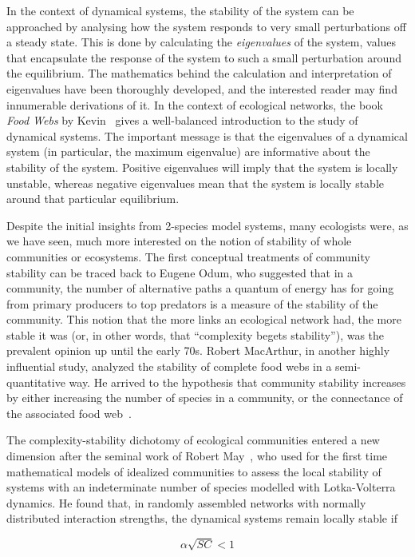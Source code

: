 In the context of dynamical systems, the stability of the system can be approached by analysing how the system responds to very small perturbations off a steady state. This is done by calculating the \textit{eigenvalues} of the system, values that encapsulate the response of the system to such a small perturbation around the equilibrium. The mathematics behind the calculation and interpretation of eigenvalues have been thoroughly developed, and the interested reader may find innumerable derivations of it. In the context of ecological networks, the book \textit{Food Webs} by Kevin~\cite{McCann2011} gives a well-balanced introduction to the study of dynamical systems. The important message is that the eigenvalues of a dynamical system (in particular, the maximum eigenvalue) are informative about the stability of the system. Positive eigenvalues will imply that the system is locally unstable, whereas negative eigenvalues mean that the system is locally stable around that particular equilibrium.

Despite the initial insights from 2-species model systems, many ecologists were, as we have seen, much more interested on the notion of stability of whole communities or ecosystems. The first conceptual treatments of community stability can be traced back to Eugene Odum, who suggested that in a community, the number of alternative paths a quantum of energy has for going from primary producers to top predators is a measure of the stability of the community. This notion that the more links an ecological network had, the more stable it was (or, in other words, that ``complexity begets stability''), was the prevalent opinion up until the early 70s. Robert MacArthur, in another highly influential study, analyzed the stability of complete food webs in a semi-quantitative way. He arrived to the hypothesis that community stability increases by either increasing the number of species in a community, or the connectance of the associated food web~\citep{MacArthur1955}.

The complexity-stability dichotomy of ecological communities entered a new dimension after the seminal work of Robert May~\citep{May1972}, who used for the first time mathematical models of idealized communities to assess the local stability of systems with an indeterminate number of species modelled with Lotka-Volterra dynamics. He found that, in randomly assembled networks with normally distributed interaction strengths, the dynamical systems remain locally stable if

\begin{equation}
\alpha \sqrt{SC} < 1\label{eq:May}
\end{equation}

